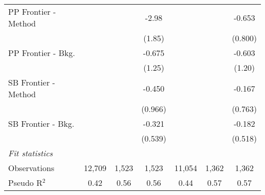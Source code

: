 \begin{tabular}{lcccccc}
   PP Frontier - Method &               &         & -2.98   &               &         & -0.653\\   
                        &               &         & (1.85)  &               &         & (0.800)\\   
   PP Frontier - Bkg.   &               &         & -0.675  &               &         & -0.603\\   
                        &               &         & (1.25)  &               &         & (1.20)\\   
   SB Frontier - Method &               &         & -0.450  &               &         & -0.167\\   
                        &               &         & (0.966) &               &         & (0.763)\\   
   SB Frontier - Bkg.   &               &         & -0.321  &               &         & -0.182\\   
                        &               &         & (0.539) &               &         & (0.518)\\   
   \midrule
   \emph{Fit statistics}\\
   Observations         & 12,709        & 1,523   & 1,523   & 11,054        & 1,362   & 1,362\\  
   Pseudo R$^2$         & 0.42          & 0.56    & 0.56    & 0.44          & 0.57    & 0.57\\  
   

\end{tabular}
